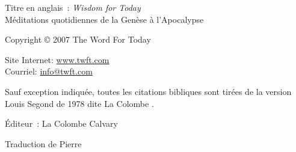 \newpage
\mbox{}
\vfill
\noindent Titre en anglais~: \emph{Wisdom for Today}\\
Méditations quotidiennes de la Genèse à l'Apocalypse

\noindent Copyright \copyright{} 2007 The Word For Today

\noindent Site Internet: \url{www.twft.com}\\
\noindent Courriel: \url{info@twft.com}

\noindent Sauf exception indiquée, toutes les citations bibliques sont tirées de
 la version Louis Segond de 1978 dite \og La Colombe \fg{}.


\noindent Éditeur~: La Colombe Calvary

\noindent Traduction de Pierre 

